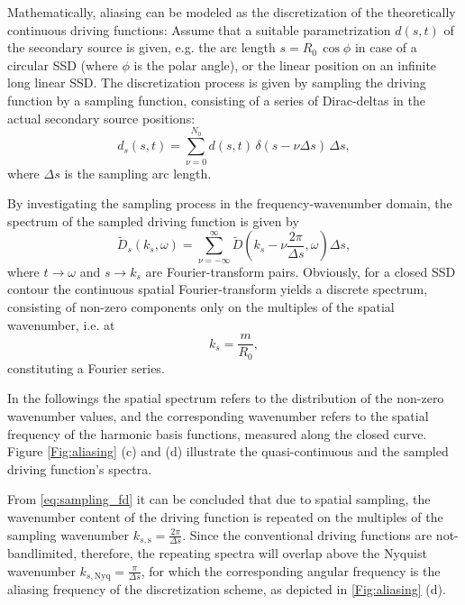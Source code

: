 \documentclass[conference]{IEEEtran}
\begin{document}
Mathematically, aliasing can be modeled as the discretization of the theoretically continuous driving functions:
Assume that a suitable parametrization $d(s,t)$ of the secondary source is given, e.g. the arc length $s = R_0\, \cos \phi$ in case of a circular SSD (where $\phi$ is the polar angle), or the linear position on an infinite long linear SSD.
The discretization process is given by sampling the driving function by a sampling function, consisting of a series of Dirac-deltas in the actual secondary source positions:
\begin{equation}
    d_s(s,t) = \sum_{\nu = 0}^{N_0} d(s,t) \, \delta(s - \nu \Delta s) \, \Delta s,
    \label{eq:sampling_td}
\end{equation}
where $\Delta s$ is the sampling arc length.

By investigating the sampling process in the frequency-wavenumber domain, the spectrum of the sampled driving function is given by
\begin{equation}
    \tilde{D}_s(k_s,\omega) = \sum_{\nu = -\infty}^{\infty} \tilde{D}\left(k_s- \nu \frac{2\pi}{\Delta s},\omega\right) \Delta s,
    \label{eq:sampling_fd}
\end{equation}
where $t \rightarrow \omega$ and $s \rightarrow k_s$ are Fourier-transform pairs.
Obviously, for a closed SSD contour the continuous spatial Fourier-transform yields a discrete spectrum, consisting of non-zero components only on the multiples of the spatial wavenumber, i.e. at
\begin{equation}
    k_s = \frac{m}{R_0},
\end{equation}
constituting a Fourier series.

In the followings the spatial spectrum refers to the distribution of the non-zero wavenumber values, and the corresponding wavenumber refers to the spatial frequency of the harmonic basis functions, measured along the closed curve.
Figure \ref{Fig:aliasing} (c) and (d) illustrate the quasi-continuous and the sampled driving function's spectra.

From \eqref{eq:sampling_fd} it can be concluded that due to spatial sampling, the wavenumber content of the driving function is repeated on the multiples of the sampling wavenumber $k_{s, \mathrm{s}} = \frac{2\pi}{\Delta s}$.
Since the conventional driving functions are not-bandlimited, therefore, the repeating spectra will overlap above the Nyquist wavenumber $k_{s, \mathrm{Nyq}} = \frac{\pi}{\Delta s}$, for which the corresponding angular frequency is the aliasing frequency of the discretization scheme, as depicted in \ref{Fig:aliasing} (d).
\end{document}

